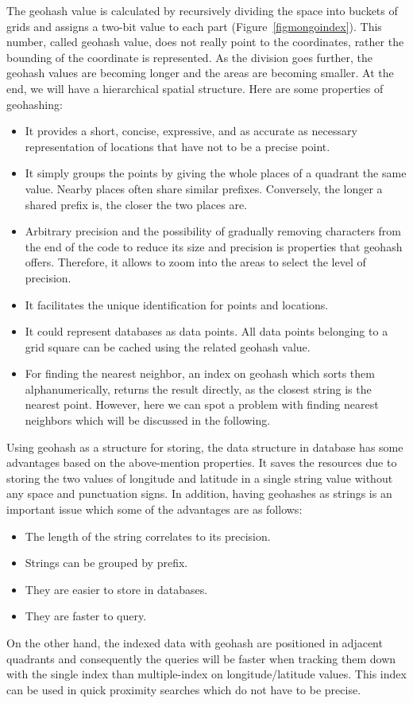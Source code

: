 \documentclass[a4paper,12pt]{article}
\begin{document}
The geohash value is calculated by recursively dividing the space into buckets of grids and assigns a two-bit value to each part (Figure~\ref{figmongoindex}). This number, called geohash value, does not really point to the coordinates, rather the bounding of the coordinate is represented. 
As the division goes further, the geohash values are becoming longer and the areas are becoming smaller. 
At the end, we will have a hierarchical spatial structure. Here are some properties of geohashing:
\begin{itemize}
\item It provides a short, concise, expressive, and as accurate as necessary representation of locations that have not to be a precise point.
\item It simply groups the points by giving the whole places of a quadrant the same value. Nearby places often share similar prefixes. Conversely, the longer a shared prefix is, the closer the two places are. 
\item Arbitrary precision and the possibility of gradually removing characters from the end of the code to reduce its size and precision is properties that geohash offers. Therefore, it allows to zoom into the areas to select the level of precision.
\item It facilitates the unique identification for points and locations.
\item It could represent databases as data points. All data points belonging to a grid square can be cached using the related geohash value.
\item For finding the nearest neighbor, an index on geohash which sorts them alpha\-numerically, returns the result directly, as the closest string is the nearest point. However, here we can spot a problem with finding nearest neighbors which will be discussed in the following.
\end{itemize}

Using geo\-hash as a structure for storing, the data structure in database has some advantages based on the above-mention properties. It saves the resources due to storing the two values of longitude and latitude in a single string value without any space and punctuation signs. 
In addition, having geohashes as strings is an important issue which some of the advantages are as follows:
\begin{itemize}
\item The length of the string correlates to its precision.
\item Strings can be grouped by prefix.
\item They are easier to store in databases.
\item They are faster to query. 
\end{itemize}
On the other hand, the indexed data with geohash are positioned in adjacent quadrants and consequently the queries will be faster when tracking them down with the single index than multiple-index on longitude/latitude values. This index can be used in quick proximity searches which do not have to be precise.
\end{document}
